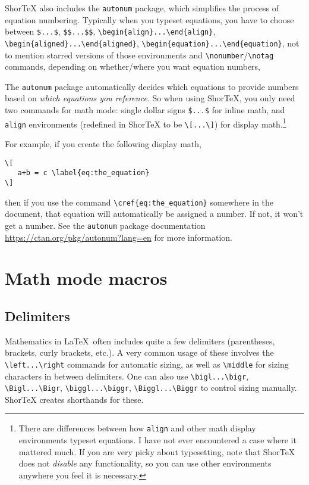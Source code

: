 \documentclass{article}
\begin{document}
ShorTeX also includes the \texttt{autonum} package, which simplifies the process of 
equation numbering. Typically when you typeset equations, you have to choose between 
\verb!$...$!, \verb!$$...$$!, 
\verb!\begin{align}...\end{align}!, 
\verb!\begin{aligned}...\end{aligned}!, 
\verb!\begin{equation}...\end{equation}!, 
not to mention starred versions of those environments 
and \verb!\nonumber!/\verb!\notag! commands, depending 
on whether/where you want equation numbers,

The \texttt{autonum} package automatically decides which equations to provide
numbers based on \textit{which equations you reference}. So when using ShorTeX,
you only need two commands for math mode: single dollar signs \verb!$...$! for
inline math, and \texttt{align} environments (redefined in ShorTeX to be
\verb!\[...\]!) for display math.\footnote{There are
differences between how \texttt{align} and 
other math display environments typeset equations. I have not ever
encountered a case where it mattered much. If you are very picky about typesetting,
note that ShorTeX does not \emph{disable} any functionality, so you 
can use other environments anywhere you feel it is necessary.}

For example, if you create 
the following display math,
\begin{verbatim}
\[
   a+b = c \label{eq:the_equation}
\]
\end{verbatim}
then if you use the command \verb!\cref{eq:the_equation}! somewhere
in the document, that equation will automatically be assigned a number. If not, it
won't get a number. See the \texttt{autonum} package 
documentation \url{https://ctan.org/pkg/autonum?lang=en} for more information.



\section{Math mode macros}

\subsection{Delimiters}

Mathematics in \LaTeX~often includes quite a few delimiters (parentheses, brackets, curly brackets, etc.).
A very common usage of these involves the \verb!\left...\right! commands for automatic sizing, as well as \verb!\middle! 
for sizing characters in between delimiters.
One can also use \verb!\bigl...\bigr!, \verb!\Bigl...\Bigr!, \verb!\biggl...\biggr!, \verb!\Biggl...\Biggr! to control sizing manually.
ShorTeX creates shorthands for these.
\end{document}
